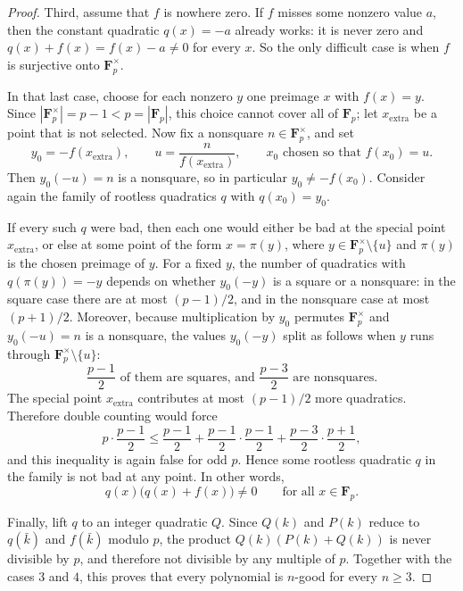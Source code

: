 \begin{proof}
Third, assume that \(f\) is nowhere zero. If \(f\) misses some nonzero value
\(a\), then the constant quadratic \(q(x)=-a\) already works: it is never zero
and \(q(x)+f(x)=f(x)-a\neq 0\) for every \(x\). So the only difficult case is
when \(f\) is surjective onto \(\mathbf F_p^\times\).

In that last case, choose for each nonzero \(y\) one preimage \(x\) with
\(f(x)=y\). Since \(|\mathbf F_p^\times|=p-1<p=|\mathbf F_p|\), this choice
cannot cover all of \(\mathbf F_p\); let \(x_{\mathrm{extra}}\) be a point that
is not selected. Now fix a nonsquare \(n\in\mathbf F_p^\times\), and set
\[
  y_0=-f(x_{\mathrm{extra}}),\qquad
  u=\frac{n}{f(x_{\mathrm{extra}})},\qquad
  x_0 \text{ chosen so that } f(x_0)=u.
\]
Then \(y_0(-u)=n\) is a nonsquare, so in particular \(y_0\neq -f(x_0)\).
Consider again the family of rootless quadratics \(q\) with \(q(x_0)=y_0\).

If every such \(q\) were bad, then each one would either be bad at the special
point \(x_{\mathrm{extra}}\), or else at some point of the form \(x=\pi(y)\),
where \(y\in\mathbf F_p^\times\setminus\{u\}\) and \(\pi(y)\) is the chosen
preimage of \(y\). For a fixed \(y\), the number of quadratics with
\(q(\pi(y))=-y\) depends on whether \(y_0(-y)\) is a square or a nonsquare:
in the square case there are at most \((p-1)/2\), and in the nonsquare case at
most \((p+1)/2\). Moreover, because multiplication by \(y_0\) permutes
\(\mathbf F_p^\times\) and \(y_0(-u)=n\) is a nonsquare, the values
\(y_0(-y)\) split as follows when \(y\) runs through
\(\mathbf F_p^\times\setminus\{u\}\):
\[
  \frac{p-1}{2}\text{ of them are squares, and }\frac{p-3}{2}\text{ are nonsquares.}
\]
The special point \(x_{\mathrm{extra}}\) contributes at most \((p-1)/2\) more
quadratics. Therefore double counting would force
\[
  p\cdot\frac{p-1}{2}
  \le
  \frac{p-1}{2}
  +\frac{p-1}{2}\cdot\frac{p-1}{2}
  +\frac{p-3}{2}\cdot\frac{p+1}{2},
\]
and this inequality is again false for odd \(p\). Hence some rootless
quadratic \(q\) in the family is not bad at any point. In other words,
\[
  q(x)\bigl(q(x)+f(x)\bigr)\neq 0
  \qquad\text{for all }x\in\mathbf F_p.
\]

Finally, lift \(q\) to an integer quadratic \(Q\). Since \(Q(k)\) and \(P(k)\)
reduce to \(q(\bar k)\) and \(f(\bar k)\) modulo \(p\), the product
\(Q(k)(P(k)+Q(k))\) is never divisible by \(p\), and therefore not divisible by
any multiple of \(p\). Together with the cases \(3\) and \(4\), this proves that
every polynomial is \(n\)-good for every \(n\ge 3\).
\end{proof}

